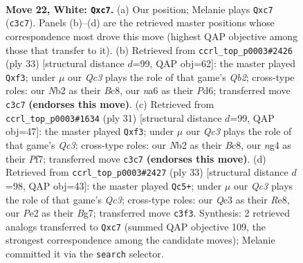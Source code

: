 \documentclass[11pt]{article}
\begin{document}
\clearpage

\begin{figure}[p]\centering
\begin{subfigure}{0.46\textwidth}\centering
\resizebox{\linewidth}{!}{%
\newchessgame
\chessboard[
  setfen={2r1b1k1/p1qr1pp1/n3p3/1p5p/3P1Pn1/1PQ3P1/1N2P2P/R1B1RBK1 w - - 0 22},
  showmover=false,
  pgfstyle=straightmove, color=movearrow, markmove={c3-c7}
]}
\caption{}
\end{subfigure}\hfill
\begin{subfigure}{0.46\textwidth}\centering
\resizebox{\linewidth}{!}{%
\newchessgame
\chessboard[
  setfen={2b1kb1r/1q3p1p/p2pp3/5P2/1r3P2/1PNR1Q2/2P1B1PP/2K4R b k - 0 17},
  showmover=false,
  pgfstyle=straightmove, color=movearrow, markmove={b7-f3}
]}
\caption{}
\end{subfigure}
\\[4pt]
\begin{subfigure}{0.46\textwidth}\centering
\resizebox{\linewidth}{!}{%
\newchessgame
\chessboard[
  setfen={2b1kb1r/5p1p/p1qpp3/5P2/1r3P2/2NR1Q2/1PP1B1PP/2K4R b k - 0 16},
  showmover=false,
  pgfstyle=straightmove, color=movearrow, markmove={c6-f3}
]}
\caption{}
\end{subfigure}\hfill
\begin{subfigure}{0.46\textwidth}\centering
\resizebox{\linewidth}{!}{%
\newchessgame
\chessboard[
  setfen={1rb1r1k1/5pbp/p1qp1p2/1p3P2/8/P1NB1Q2/1PP3PP/4RRK1 b - - 0 17},
  showmover=false,
  pgfstyle=straightmove, color=movearrow, markmove={c6-c5}
]}
\caption{}
\end{subfigure}
\caption{\textbf{Move 22, White: \texttt{Qxc7}.} (a) Our position; Melanie plays \texttt{Qxc7} (\texttt{c3c7}). Panels (b)--(d) are the retrieved master positions whose correspondence most drove this move (highest QAP objective among those that transfer to it). (b) Retrieved from \texttt{ccrl\_top\_p0003\#2426} (ply 33) [structural distance $d$=99, QAP obj=62]: the master played \texttt{Qxf3}; under $\mu$ our \emph{Qc3} plays the role of that game's \emph{Qb2}; cross-type roles: our \emph{N}b2 as their \emph{B}c8, our \emph{n}a6 as their \emph{P}d6; transferred move \texttt{c3c7} \textbf{(endorses this move)}. (c) Retrieved from \texttt{ccrl\_top\_p0003\#1634} (ply 31) [structural distance $d$=99, QAP obj=47]: the master played \texttt{Qxf3}; under $\mu$ our \emph{Qc3} plays the role of that game's \emph{Qc3}; cross-type roles: our \emph{N}b2 as their \emph{B}c8, our \emph{n}g4 as their \emph{P}f7; transferred move \texttt{c3c7} \textbf{(endorses this move)}. (d) Retrieved from \texttt{ccrl\_top\_p0003\#2427} (ply 33) [structural distance $d$=98, QAP obj=43]: the master played \texttt{Qc5+}; under $\mu$ our \emph{Qc3} plays the role of that game's \emph{Qc3}; cross-type roles: our \emph{Q}c3 as their \emph{R}e8, our \emph{P}e2 as their \emph{B}g7; transferred move \texttt{c3f3}. Synthesis: 2 retrieved analogs transferred to \texttt{Qxc7} (summed QAP objective 109, the strongest correspondence among the candidate moves); Melanie committed it via the \texttt{search} selector.}
\label{fig:thought-m42}
\end{figure}
\end{document}
